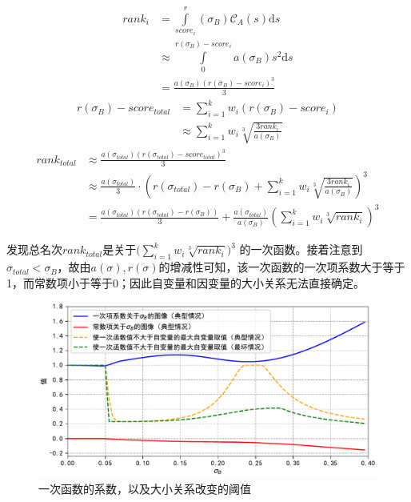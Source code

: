             \begin{align*}
                \textit{rank}_i
                &=\int\limits_{\textit{score}_i}^r(\sigma_B) \mathcal{C}_A(s) \mathrm{d}s \\
                &\approx\int\limits_0^{r(\sigma_B)-\textit{score}_i} a(\sigma_B) s^2 \mathrm{d}s \\
                &=\frac{a(\sigma_B)\left(r(\sigma_B)-\textit{score}_i\right)^3}3
            \end{align*}
            \begin{align*}
                r(\sigma_B)-\textit{score}_{\textit{total}}
                &=\sum\limits_{i=1}^k w_i\left(r(\sigma_B)-\textit{score}_i\right) \\
                &\approx\sum\limits_{i=1}^k w_i\sqrt[3]{\frac{3\textit{rank}_i}{a(\sigma_B)}}
            \end{align*}
            \begin{align*}
                \textit{rank}_{\textit{total}}
                &\approx\frac{a(\sigma_{\textit{total}})(r(\sigma_{\textit{total}})-\textit{score}_{\textit{total}})^3}3 \\
                &\approx\frac{a(\sigma_{\textit{total}})}{3}\cdot\left(r(\sigma_{\textit{total}})-r(\sigma_B)+\sum\limits_{i=1}^k w_i\sqrt[3]{\frac{3\textit{rank}_i}{a(\sigma_B)}}\right)^3 \\
                &=\frac{a(\sigma_{\textit{total}})\left(r(\sigma_{\textit{total}})-r(\sigma_B)\right)}{3}+\frac{a(\sigma_{\textit{total}})}{a(\sigma_B)}\left(\sum\limits_{i=1}^k w_i\sqrt[3]{\textit{rank}_i}\right)^3
            \end{align*}

            发现总名次$\textit{rank}_{\textit{total}}$是关于$\big(\sum_{i=1}^k w_i\sqrt[3]{\textit{rank}_i}\big)^3$ 的一次函数。接着注意到$\sigma_{\textit{total}}<\sigma_B$，故由$a(\sigma),r(\sigma)$的增减性可知，该一次函数的一次项系数大于等于1，而常数项小于等于0；因此自变量和因变量的大小关系无法直接确定。

            \begin{figure}[htbp]
                \centering
                \includegraphics[width=\textwidth]{fig/plottingKandB.pdf}
                \caption{一次函数的系数，以及大小关系改变的阈值}
                \label{fig:plottingKandB}
            \end{figure}

